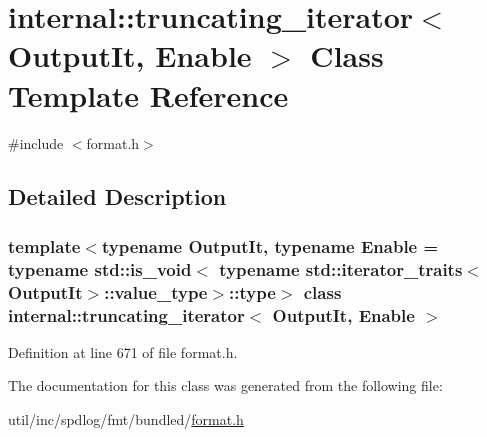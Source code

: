 \hypertarget{classinternal_1_1truncating__iterator}{}\section{internal\+:\+:truncating\+\_\+iterator$<$ Output\+It, Enable $>$ Class Template Reference}
\label{classinternal_1_1truncating__iterator}


{\ttfamily \#include $<$format.\+h$>$}



\subsection{Detailed Description}
\subsubsection*{template$<$typename Output\+It, typename Enable = typename std\+::is\+\_\+void$<$    typename std\+::iterator\+\_\+traits$<$\+Output\+It$>$\+::value\+\_\+type$>$\+::type$>$\newline
class internal\+::truncating\+\_\+iterator$<$ Output\+It, Enable $>$}



Definition at line 671 of file format.\+h.



The documentation for this class was generated from the following file\+:\begin{DoxyCompactItemize}
\item 
util/inc/spdlog/fmt/bundled/\hyperlink{format_8h}{format.\+h}\end{DoxyCompactItemize}
